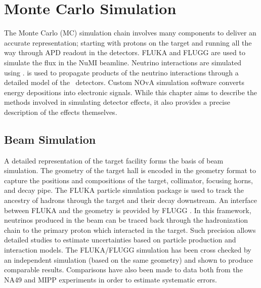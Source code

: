 \chapter{Monte Carlo Simulation}
\label{sim_chapter}


The \nova Monte Carlo (MC) simulation chain involves many components to deliver an accurate representation; starting with protons on the \numi target and running all the way through APD readout in the \nova detectors.  FLUKA and FLUGG are used to simulate the flux in the NuMI beamline.  \cite{fluka}  Neutrino interactions are simulated using \genie. \cite{genie}  \geant is used to propagate products of the neutrino interactions through a detailed model of the \nova~detectors. \cite{geant}  Custom NOvA simulation software converts energy depositions into electronic signals.  While this chapter aims to describe the methods involved in simulating detector effects, it also provides a precise description of the effects themselves.


\section{Beam Simulation}
\label{beam_sim_section}


A detailed representation of the \numi target facility forms the basis
of beam simulation.
The geometry of the target hall is encoded in the \geant geometry format
to capture the positions and compositions of the target, collimator,
focusing horns, and decay pipe.
The FLUKA \cite{fluka} particle simulation package is used to track the
ancestry of hadrons through the target and their decay downstream.
An interface between FLUKA and the \geant geometry is provided
by  FLUGG \cite{campanella1999first}.
In this framework, neutrinos produced in the beam can be traced back
through the hadronization chain to the primary proton which interacted in the
target.
Such precision allows detailed studies to estimate uncertainties based
on particle production and interaction models.
The FLUKA/FLUGG simulation has been cross checked by an independent
\geant simulation (based on the same geometry) and shown to produce
comparable results.
Comparisons have also been made to data both from the NA49
\cite{gazdzicki2004report} and MIPP \cite{paley2014measurement}
experiments in order to estimate systematic errors.

